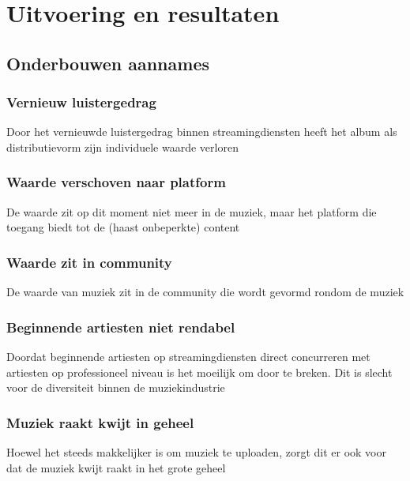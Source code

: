 \section{Uitvoering en resultaten}

\subsection{Onderbouwen aannames}

\subsubsection{Vernieuw luistergedrag}

\begin{formal}
Door het vernieuwde luistergedrag binnen streamingdiensten heeft het album als distributievorm zijn individuele waarde verloren
\end{formal}

\subsubsection{Waarde verschoven naar platform}
De waarde zit op dit moment niet meer in de muziek, maar het platform die toegang biedt tot de (haast onbeperkte) content

\subsubsection{Waarde zit in community}
De waarde van muziek zit in de community die wordt gevormd rondom de muziek

\subsubsection{Beginnende artiesten niet rendabel}
Doordat beginnende artiesten op streamingdiensten direct concurreren met artiesten op professioneel niveau is het moeilijk om door te breken. Dit is slecht voor de diversiteit binnen de muziekindustrie

\subsubsection{Muziek raakt kwijt in geheel}
Hoewel het steeds makkelijker is om muziek te uploaden, zorgt dit er ook voor dat de muziek kwijt raakt in het grote geheel

